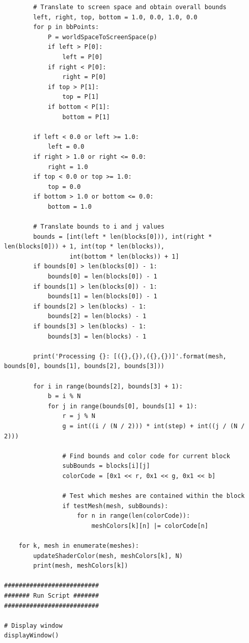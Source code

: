 \documentclass[conference]{IEEEtran}
\begin{document}
{{\begin{verbatim}
        # Translate to screen space and obtain overall bounds
        left, right, top, bottom = 1.0, 0.0, 1.0, 0.0
        for p in bbPoints:
            P = worldSpaceToScreenSpace(p)
            if left > P[0]:
                left = P[0]
            if right < P[0]:
                right = P[0]
            if top > P[1]:
                top = P[1]
            if bottom < P[1]:
                bottom = P[1]
                    
        if left < 0.0 or left >= 1.0:
            left = 0.0
        if right > 1.0 or right <= 0.0:
            right = 1.0
        if top < 0.0 or top >= 1.0:
            top = 0.0
        if bottom > 1.0 or bottom <= 0.0:
            bottom = 1.0
        
        # Translate bounds to i and j values
        bounds = [int(left * len(blocks[0])), int(right * len(blocks[0])) + 1, int(top * len(blocks)),
                  int(bottom * len(blocks)) + 1]
        if bounds[0] > len(blocks[0]) - 1:
            bounds[0] = len(blocks[0]) - 1
        if bounds[1] > len(blocks[0]) - 1:
            bounds[1] = len(blocks[0]) - 1
        if bounds[2] > len(blocks) - 1:
            bounds[2] = len(blocks) - 1
        if bounds[3] > len(blocks) - 1:
            bounds[3] = len(blocks) - 1
        
        print('Processing {}: [({},{}),({},{})]'.format(mesh, bounds[0], bounds[1], bounds[2], bounds[3]))
        
        for i in range(bounds[2], bounds[3] + 1):
            b = i % N
            for j in range(bounds[0], bounds[1] + 1):
                r = j % N
                g = int((i / (N / 2))) * int(step) + int((j / (N / 2)))
                
                # Find bounds and color code for current block
                subBounds = blocks[i][j]
                colorCode = [0x1 << r, 0x1 << g, 0x1 << b]
                
                # Test which meshes are contained within the block
                if testMesh(mesh, subBounds):
                    for n in range(len(colorCode)):
                        meshColors[k][n] |= colorCode[n]

    for k, mesh in enumerate(meshes):
        updateShaderColor(mesh, meshColors[k], N)
        print(mesh, meshColors[k])
    
##########################
####### Run Script #######
##########################

# Display window
displayWindow()
\end{verbatim}

}}
\end{document}
